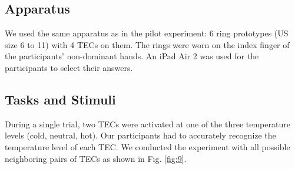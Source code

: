 \documentclass[preprint,12pt]{elsarticle}
\begin{document}
\subsection{Apparatus}
We used the same apparatus as in the pilot experiment: 6 ring prototypes (US size 6 to 11) with 4 TECs on them. The rings were worn on the index finger of the participants' non-dominant hands. An iPad Air 2 was used for the participants to select their answers.

\subsection{Tasks and Stimuli}
During a single trial, two TECs were activated at one of the three temperature levels (cold, neutral, hot). Our participants had to accurately recognize the temperature level of each TEC. We conducted the experiment with all possible neighboring pairs of TECs as shown in Fig. \ref{fig:9}.

\end{document}
